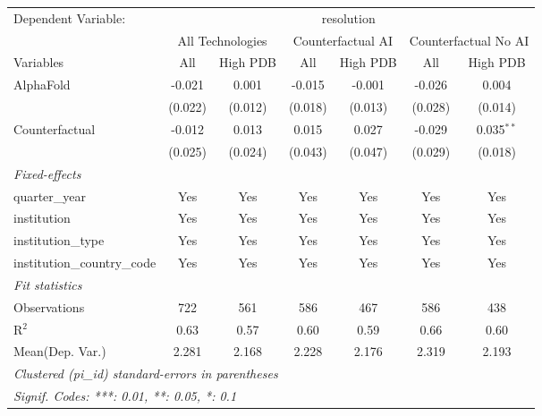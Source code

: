 \begingroup
\centering
\begin{tabular}{lcccccc}
   \tabularnewline \midrule \midrule
   Dependent Variable: & \multicolumn{6}{c}{resolution}\\
 & \multicolumn{2}{c}{All Technologies} & \multicolumn{2}{c}{Counterfactual AI} & \multicolumn{2}{c}{Counterfactual No AI} \\
\cmidrule(lr){1-1}\cmidrule(lr){2-3} \cmidrule(lr){4-5} \cmidrule(lr){6-7}
Variables & \multicolumn{1}{c}{All} & \multicolumn{1}{c}{High PDB} & \multicolumn{1}{c}{All} & \multicolumn{1}{c}{High PDB} & \multicolumn{1}{c}{All} & \multicolumn{1}{c}{High PDB} \\
\cmidrule(lr){1-1}\cmidrule(lr){2-2} \cmidrule(lr){3-3} \cmidrule(lr){4-4} \cmidrule(lr){5-5} \cmidrule(lr){6-6} \cmidrule(lr){7-7}
   AlphaFold                    & -0.021  & 0.001   & -0.015  & -0.001  & -0.026  & 0.004\\   
                                & (0.022) & (0.012) & (0.018) & (0.013) & (0.028) & (0.014)\\   
   Counterfactual               & -0.012  & 0.013   & 0.015   & 0.027   & -0.029  & 0.035$^{**}$\\   
                                & (0.025) & (0.024) & (0.043) & (0.047) & (0.029) & (0.018)\\   
   \midrule
   \emph{Fixed-effects}\\
   quarter\_year                & Yes     & Yes     & Yes     & Yes     & Yes     & Yes\\  
   institution                  & Yes     & Yes     & Yes     & Yes     & Yes     & Yes\\  
   institution\_type            & Yes     & Yes     & Yes     & Yes     & Yes     & Yes\\  
   institution\_country\_code   & Yes     & Yes     & Yes     & Yes     & Yes     & Yes\\  
   \midrule
   \emph{Fit statistics}\\
   Observations                 & 722     & 561     & 586     & 467     & 586     & 438\\  
   R$^2$                        & 0.63    & 0.57    & 0.60    & 0.59    & 0.66    & 0.60\\  
Mean(Dep. Var.) & 2.281 & 2.168 & 2.228 & 2.176 & 2.319 & 2.193 \\
   \midrule \midrule
   \multicolumn{7}{l}{\emph{Clustered (pi\_id) standard-errors in parentheses}}\\
   \multicolumn{7}{l}{\emph{Signif. Codes: ***: 0.01, **: 0.05, *: 0.1}}\\
\end{tabular}
\par\endgroup
